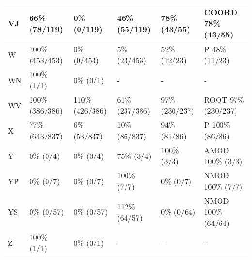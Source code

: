\begin{figure*}
\begin{tabular}{|l|l|l|l|l|l|}
\hline
VJ & 66\% (78/119) & 0\% (0/119) & 46\% (55/119) & 78\% (43/55) & COORD 78\% (43/55) \\ 
\hline
W & 100\% (453/453) & 0\% (0/453) & 5\% (23/453) & 52\% (12/23) & P 48\% (11/23) \\ 
\hline
WN & 100\% (1/1) & 0\% (0/1) & - & - & - \\ 
\hline
WV & 100\% (386/386) & 110\% (426/386) & 61\% (237/386) & 97\% (230/237) & ROOT 97\% (230/237) \\ 
\hline
X & 77\% (643/837) & 6\% (53/837) & 10\% (86/837) & 94\% (81/86) & P 100\% (86/86) \\ 
\hline
Y & 0\% (0/4) & 0\% (0/4) & 75\% (3/4) & 100\% (3/3) & AMOD 100\% (3/3) \\ 
\hline
YP & 0\% (0/7) & 0\% (0/7) & 100\% (7/7) & 0\% (0/7) & NMOD 100\% (7/7) \\ 
\hline
YS & 0\% (0/57) & 0\% (0/57) & 112\% (64/57) & 0\% (0/64) & NMOD 100\% (64/64) \\ 
\hline
Z & 100\% (1/1) & 0\% (0/1) & - & - & - \\ 
\hline
\end{tabular}
\end{figure*}
